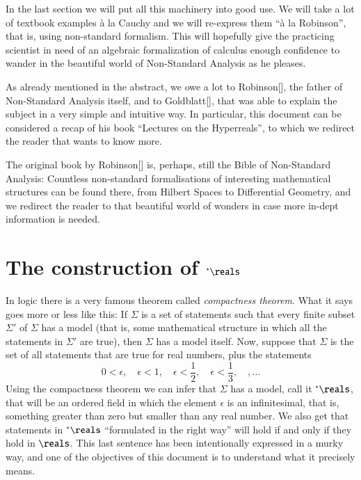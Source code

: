 \documentclass[adraft, copyright,creativecommons,sharealike,noncommercial]{eptcs}
\newcommand{\nstar}{{^*}}
\begin{document}
In the last section we will put all this machinery into good use. We will take a lot of textbook examples \`a la Cauchy and we will re-express them ``\`a la Robinson'', that is, using non-standard formalism. This will hopefully give the practicing scientist in need of an algebraic formalization of calculus enough confidence to wander in the beautiful world of Non-Standard Analysis as he pleases.

As already mentioned in the abstract, we owe a lot to Robinson[], the father of Non-Standard Analysis itself, and to Goldblatt[], that was able to explain the subject in a very simple and intuitive way. In particular, this document can be considered a recap of his book ``Lectures on the Hyperreals'', to which we redirect the reader that wants to know more.

The original book by Robinson[] is, perhaps, still the Bible of Non-Standard Analysis: Countless non-standard formalisations of interesting mathematical structures can be found there, from Hilbert Spaces to Differential Geometry, and we redirect the reader to that beautiful world of wonders in case more in-dept information is needed.

\section{The construction of $\nstar \reals$}
In logic there is a very famous theorem called \emph{compactness theorem}. What it says goes more or less like this: If $\Sigma$ is a set of statements such that every finite subset $\Sigma'$ of $\Sigma$ has a model (that is, some mathematical structure in which all the statements in $\Sigma'$ are true), then $\Sigma$ has a model itself. Now, suppose that $\Sigma$ is the set of all statements that are true for real numbers, plus the statements
\begin{equation*}
	0 < \epsilon,\quad \epsilon < 1,\quad \epsilon < \frac{1}{2}, \quad \epsilon < \frac{1}{3}, \quad, \dots
\end{equation*}
Using the compactness theorem we can infer that $\Sigma$ has a model, call it $\nstar \reals$, that will be an ordered field in which the element $\epsilon$ is an infinitesimal, that is, something greater than zero but smaller than any real number. We also get that statements in $\nstar \reals$ ``formulated in the right way'' will hold if and only if they hold in $\reals$. This last sentence has been intentionally expressed in a murky way, and one of the objectives of this document is to understand what it precisely means.
\end{document}
